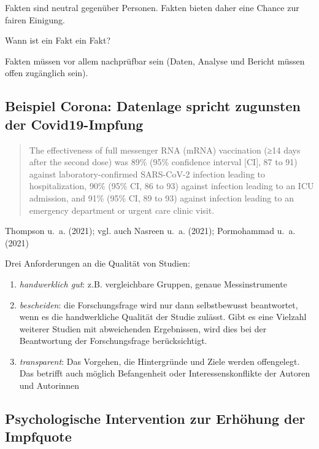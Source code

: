 \documentclass[
  a4paper,
  DIV=11]{scrreprt}
\providecommand{\tightlist}{%
  \setlength{\itemsep}{0pt}\setlength{\parskip}{0pt}}\usepackage{longtable,booktabs,array}
\theoremstyle{definition}
\theoremstyle{remark}
\begin{document}
Fakten sind neutral gegenüber Personen. Fakten bieten daher eine Chance
zur fairen Einigung.

Wann ist ein Fakt ein Fakt?

Fakten müssen vor allem nachprüfbar sein (Daten, Analyse und Bericht
müssen offen zugänglich sein).

\hypertarget{beispiel-corona-datenlage-spricht-zugunsten-der-covid19-impfung}{%
\subsection{Beispiel Corona: Datenlage spricht zugunsten der
Covid19-Impfung}\label{beispiel-corona-datenlage-spricht-zugunsten-der-covid19-impfung}}

\begin{quote}
The effectiveness of full messenger RNA (mRNA) vaccination (≥14 days
after the second dose) was 89\% (95\% confidence interval {[}CI{]}, 87
to 91) against laboratory-confirmed SARS-CoV-2 infection leading to
hospitalization, 90\% (95\% CI, 86 to 93) against infection leading to
an ICU admission, and 91\% (95\% CI, 89 to 93) against infection leading
to an emergency department or urgent care clinic visit.
\end{quote}

Thompson u.~a. (2021); vgl. auch Nasreen u.~a. (2021); Pormohammad u.~a.
(2021)

Drei Anforderungen an die Qualität von Studien:

\begin{enumerate}
\def\labelenumi{\arabic{enumi}.}
\tightlist
\item
  \emph{handwerklich gut}: z.B. vergleichbare Gruppen, genaue
  Messinstrumente
\item
  \emph{bescheiden}: die Forschungsfrage wird nur dann selbstbewusst
  beantwortet, wenn es die handwerkliche Qualität der Studie zulässt.
  Gibt es eine Vielzahl weiterer Studien mit abweichenden Ergebnissen,
  wird dies bei der Beantwortung der Forschungsfrage berücksichtigt.
\item
  \emph{transparent}: Das Vorgehen, die Hintergründe und Ziele werden
  offengelegt. Das betrifft auch möglich Befangenheit oder
  Interessenskonflikte der Autoren und Autorinnen
\end{enumerate}

\hypertarget{psychologische-intervention-zur-erhuxf6hung-der-impfquote}{%
\subsection{Psychologische Intervention zur Erhöhung der
Impfquote}\label{psychologische-intervention-zur-erhuxf6hung-der-impfquote}}
\end{document}
